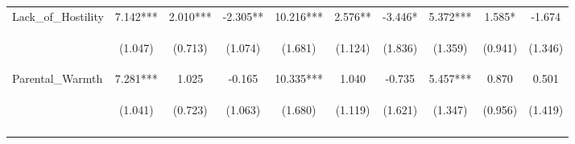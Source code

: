 \begin{tabular}{lccccccccc}
\noalign{\smallskip}Lack\_of\_Hostility & 7.142*** & 2.010*** & -2.305** & 10.216*** & 2.576** & -3.446* & 5.372*** & 1.585* & -1.674\\
 & \begin{footnotesize}(1.047)\end{footnotesize} & \begin{footnotesize}(0.713)\end{footnotesize} & \begin{footnotesize}(1.074)\end{footnotesize} & \begin{footnotesize}(1.681)\end{footnotesize} & \begin{footnotesize}(1.124)\end{footnotesize} & \begin{footnotesize}(1.836)\end{footnotesize} & \begin{footnotesize}(1.359)\end{footnotesize} & \begin{footnotesize}(0.941)\end{footnotesize} & \begin{footnotesize}(1.346)\end{footnotesize}\\
\noalign{\smallskip}Parental\_Warmth & 7.281*** & 1.025 & -0.165 & 10.335*** & 1.040 & -0.735 & 5.457*** & 0.870 & 0.501\\
 & \begin{footnotesize}(1.041)\end{footnotesize} & \begin{footnotesize}(0.723)\end{footnotesize} & \begin{footnotesize}(1.063)\end{footnotesize} & \begin{footnotesize}(1.680)\end{footnotesize} & \begin{footnotesize}(1.119)\end{footnotesize} & \begin{footnotesize}(1.621)\end{footnotesize} & \begin{footnotesize}(1.347)\end{footnotesize} & \begin{footnotesize}(0.956)\end{footnotesize} & \begin{footnotesize}(1.419)\end{footnotesize}\\
\noalign{\smallskip}\hline\end{tabular}\\
